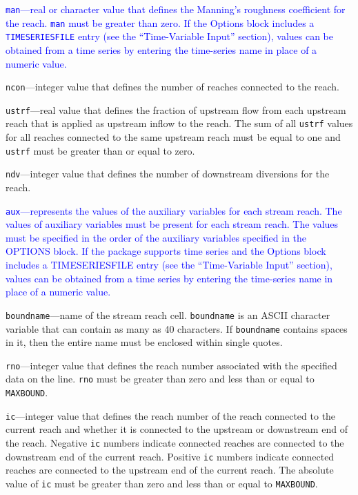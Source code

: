 \item \textcolor{blue}{\texttt{man}---real or character value that defines the Manning's roughness coefficient for the reach. \texttt{man} must be greater than zero.  If the Options block includes a \texttt{TIMESERIESFILE} entry (see the ``Time-Variable Input'' section), values can be obtained from a time series by entering the time-series name in place of a numeric value.}

\item \texttt{ncon}---integer value that defines the number of reaches connected to the reach.

\item \texttt{ustrf}---real value that defines the fraction of upstream flow from each upstream reach that is applied as upstream inflow to the reach. The sum of all \texttt{ustrf} values for all reaches connected to the same upstream reach must be equal to one and \texttt{ustrf} must be greater than or equal to zero.

\item \texttt{ndv}---integer value that defines the number of downstream diversions for the reach.

\item \textcolor{blue}{\texttt{aux}---represents the values of the auxiliary variables for each stream reach. The values of auxiliary variables must be present for each stream reach. The values must be specified in the order of the auxiliary variables specified in the OPTIONS block.  If the package supports time series and the Options block includes a TIMESERIESFILE entry (see the ``Time-Variable Input'' section), values can be obtained from a time series by entering the time-series name in place of a numeric value.}

\item \texttt{boundname}---name of the stream reach cell.  \texttt{boundname} is an ASCII character variable that can contain as many as 40 characters.  If \texttt{boundname} contains spaces in it, then the entire name must be enclosed within single quotes.

\item \texttt{rno}---integer value that defines the reach number associated with the specified data on the line. \texttt{rno} must be greater than zero and less than or equal to \texttt{MAXBOUND}.

\item \texttt{ic}---integer value that defines the reach number of the reach connected to the current reach and whether it is connected to the upstream or downstream end of the reach. Negative \texttt{ic} numbers indicate connected reaches are connected to the downstream end of the current reach. Positive \texttt{ic} numbers indicate connected reaches are connected to the upstream end of the current reach. The absolute value of \texttt{ic} must be greater than zero and less than or equal to \texttt{MAXBOUND}.

